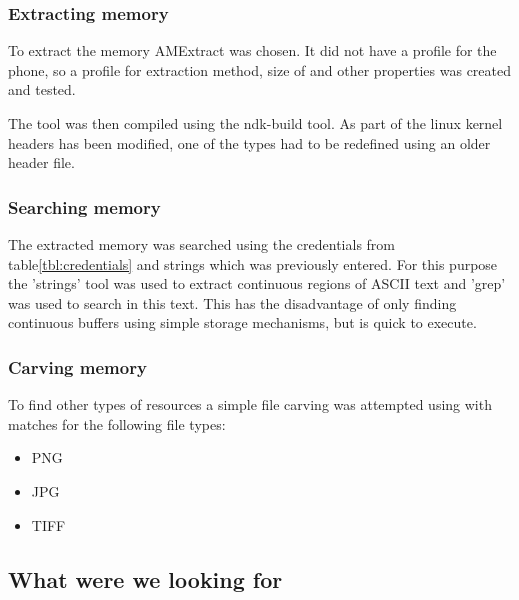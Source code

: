 


\subsubsection{Extracting memory}
To extract the memory AMExtract was chosen. %
 It did not have a profile for the phone, so a profile for extraction method, size of %
 and other properties was created and tested.
 
 The tool was then compiled using the ndk-build tool. As part of the linux kernel headers has been modified, one of the types had to be redefined using an older header file.

\subsubsection{Searching memory}
The extracted memory was searched using the credentials from table\ref{tbl:credentials} and strings which was previously entered. For this purpose the 'strings' tool was used to extract continuous regions of ASCII text and 'grep' was used to search in this text. This has the disadvantage of only finding continuous buffers using simple storage mechanisms, but is quick to execute.

\subsubsection{Carving memory}
To find other types of resources a simple file carving was attempted using %
with matches for the following file types:
\begin{itemize}
	\item PNG
	\item JPG
	\item TIFF
\end{itemize}

\subsection{What were we looking for}
\lipsum[7]